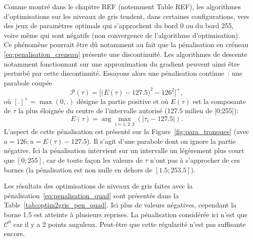 \documentclass[main.tex]{subfiles}
\begin{document}
Comme montré dans le chapitre REF (\cf notemment Table REF), les algorithmes d'optimisations sur les niveaux de gris tendent, dans certaines configurations,  vers des jeux de paramètres optimals qui s'approchent du bord 0 ou du bord 255, voire même qui sont négatifs (\ie non convergence de l'algorithme d'optimisation). Ce phénomène pourrait être dû notamment au fait que la pénalisation en créneau \eqref{eq:penalisation_creneau} présente une discontinuité. Les algorithmes de descente notamment fonctionnant sur une approximation du gradient peuvent ainsi être perturbé par cette discontinuité. Essayons alors une pénalisation continue~: une parabole coupée
\begin{equation}
\label{eq:penalisation_quad}
\mathcal{P}(\tau) = \Big[ \big(  E(\tau) - 127.5 \big)^2-126^2 \Big]^+,
\end{equation}
où $[.]^+=\max(0,.)$ désigne la partie positive et où $E(\tau)$ est la composante de $\tau$ la plus éloignée du centre de l'intervalle autorisé (127.5 milieu de [0;255]):
\begin{equation}
\label{eq:tau_eloigne} E(\tau)= \arg\max_{i=1,2,3}( | \tau_i-127.5 | ).
\end{equation} 
L'aspect de cette pénalisation est présenté sur la Figure~\ref{fig:para_tronquee} (avec $a=126; u=E(\tau)-127.5$). Il s'agit d'une parabole dont on ignore la partie négative. 
Ici la pénalisation intervient sur un intervalle un légèrement plus court que $[0;255]$, car de toute façon les valeurs de $\tau$ n'ont pas à s'approcher de ces bornes (la pénalisation est non nulle en dehors de $[1.5;253.5]$).



Les résultats des optimisations de niveaux de gris faites avec la pénalisation~\eqref{eq:penalisation_quad} sont présentés dans la Table~\ref{tab:optim2gris_pen_quad}. Ici plus de valeurs négatives, cependant la borne 1.5 est atteinte à plusieurs reprises. La pénalisation considérée ici n'est que $\mathcal{C}^0$ car il y a 2 points anguleux. Peut-être que cette régularité n'est pas suffisante encore.
\end{document}
